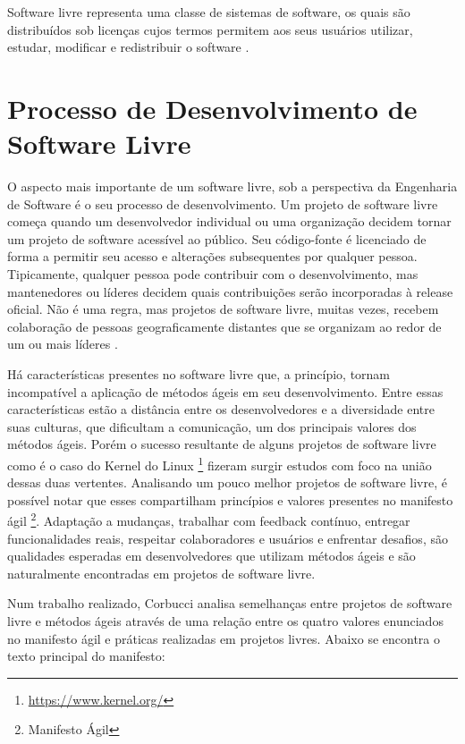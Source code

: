 Software livre representa uma classe de sistemas de software, os quais são distribuídos sob licenças cujos termos permitem aos seus usuários utilizar, estudar, modificar e redistribuir o software \cite{terceiro2012freesoftware}. 

\section{Processo de Desenvolvimento de Software Livre}

O aspecto mais importante de um software livre, sob a perspectiva da Engenharia de Software é o seu processo de desenvolvimento. Um projeto de software livre começa quando um desenvolvedor individual ou uma organização decidem tornar um projeto de software acessível ao público. Seu código-fonte é licenciado de forma a permitir seu acesso e alterações subsequentes por qualquer pessoa. Tipicamente, qualquer pessoa pode contribuir com o desenvolvimento, mas mantenedores ou líderes decidem quais contribuições serão incorporadas à release oficial. Não é uma regra, mas projetos de software livre, muitas vezes, recebem colaboração de pessoas geograficamente distantes que se organizam ao redor de um ou mais líderes \cite{corbucci2011freemethods}. 

Há características presentes no software livre que, a princípio, tornam incompatível a aplicação de métodos ágeis em seu desenvolvimento. Entre essas características estão a distância entre os desenvolvedores e a diversidade entre suas culturas, que dificultam a comunicação, um dos principais valores dos métodos ágeis. Porém o sucesso resultante de alguns projetos de software livre como é o caso do Kernel do Linux \footnote{\url{https://www.kernel.org/}} fizeram surgir estudos com foco na união dessas duas vertentes. Analisando um pouco melhor projetos de software livre, é possível notar que esses compartilham princípios e valores presentes no manifesto ágil \footnote{Manifesto Ágil}. Adaptação a mudanças, trabalhar com feedback contínuo, entregar funcionalidades reais, respeitar colaboradores e usuários e enfrentar desafios, são qualidades esperadas em desenvolvedores que utilizam métodos ágeis e são naturalmente encontradas em projetos de software livre.

Num trabalho realizado, Corbucci \cite{corbucci2011freemethods} analisa semelhanças entre projetos de software livre e métodos ágeis através de uma relação entre os quatro valores enunciados no manifesto ágil e práticas realizadas em projetos livres. Abaixo se encontra o texto principal do manifesto:

